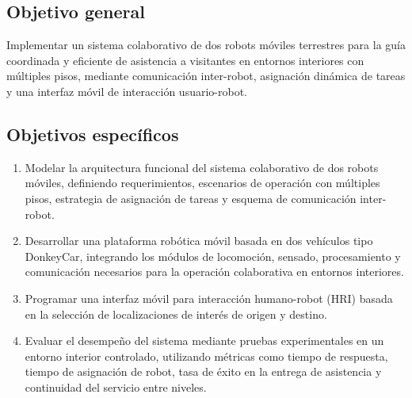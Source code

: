 \subsection{Objetivo general}

Implementar un sistema colaborativo de dos robots móviles terrestres para la guía
coordinada y eficiente de asistencia a visitantes en entornos interiores con
múltiples pisos, mediante comunicación inter-robot, asignación dinámica de tareas
y una interfaz móvil de interacción usuario-robot.

\subsection{Objetivos específicos}

\begin{enumerate}[leftmargin=*,label=\textbf{\arabic*.}]
  \item Modelar la arquitectura funcional del sistema colaborativo de dos robots
    móviles, definiendo requerimientos, escenarios de operación con múltiples
    pisos, estrategia de asignación de tareas y esquema de comunicación
    inter-robot.
  \item Desarrollar una plataforma robótica móvil basada en dos vehículos tipo
    DonkeyCar, integrando los módulos de locomoción, sensado, procesamiento y
    comunicación necesarios para la operación colaborativa en entornos
    interiores.
  \item Programar una interfaz móvil para interacción humano-robot (HRI) basada
    en la selección de localizaciones de interés de origen y destino.
  \item Evaluar el desempeño del sistema mediante pruebas experimentales en un
    entorno interior controlado, utilizando métricas como tiempo de respuesta,
    tiempo de asignación de robot, tasa de éxito en la entrega de asistencia y
    continuidad del servicio entre niveles.
\end{enumerate}

